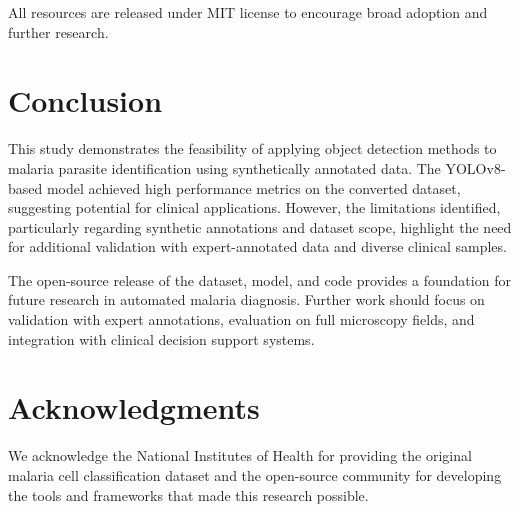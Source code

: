 \documentclass[10pt,twocolumn]{article}
\begin{document}
All resources are released under MIT license to encourage broad adoption and further research.

\section{Conclusion}

This study demonstrates the feasibility of applying object detection methods to malaria parasite identification using synthetically annotated data. The YOLOv8-based model achieved high performance metrics on the converted dataset, suggesting potential for clinical applications. However, the limitations identified, particularly regarding synthetic annotations and dataset scope, highlight the need for additional validation with expert-annotated data and diverse clinical samples.

The open-source release of the dataset, model, and code provides a foundation for future research in automated malaria diagnosis. Further work should focus on validation with expert annotations, evaluation on full microscopy fields, and integration with clinical decision support systems.

\section*{Acknowledgments}

We acknowledge the National Institutes of Health for providing the original malaria cell classification dataset and the open-source community for developing the tools and frameworks that made this research possible.
\end{document}
